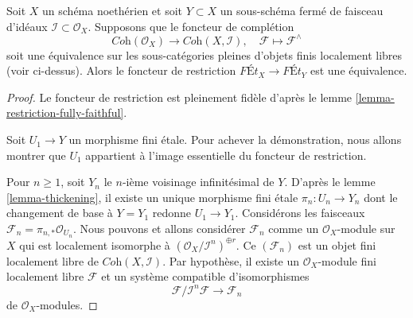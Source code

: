 \begin{lemma}
\label{lemma-restriction-equivalence}
Soit $X$ un schéma noethérien et soit $Y \subset X$ un sous-schéma fermé
de faisceau d'idéaux $\mathcal{I} \subset \mathcal{O}_X$.
Supposons que le foncteur de complétion
$$
\textit{Coh}(\mathcal{O}_X)
\longrightarrow 
\textit{Coh}(X, \mathcal{I}),\quad
\mathcal{F} \longmapsto \mathcal{F}^\wedge
$$
soit une équivalence sur les sous-catégories pleines d'objets finis
localement libres (voir ci-dessus).
Alors le foncteur de restriction $\textit{F\'Et}_X \to \textit{F\'Et}_Y$
est une équivalence.
\end{lemma}

\begin{proof}
Le foncteur de restriction est pleinement fidèle d'après le
lemme \ref{lemma-restriction-fully-faithful}.

\medskip\noindent
Soit $U_1 \to Y$ un morphisme fini étale. Pour achever la démonstration,
nous allons montrer que $U_1$ appartient à l'image essentielle du
foncteur de restriction.

\medskip\noindent
Pour $n \geq 1$, soit $Y_n$ le $n$-ième voisinage infinitésimal de $Y$.
D'après le lemme \ref{lemma-thickening},
il existe un unique morphisme fini étale
$\pi_n : U_n \to Y_n$ dont le changement de base à $Y = Y_1$
redonne $U_1 \to Y_1$.
Considérons les faisceaux $\mathcal{F}_n = \pi_{n, *}\mathcal{O}_{U_n}$.
Nous pouvons et allons considérer $\mathcal{F}_n$ comme un $\mathcal{O}_X$-module sur $X$
qui est localement isomorphe à
$(\mathcal{O}_X/\mathcal{I}^n)^{\oplus r}$.
Ce $(\mathcal{F}_n)$ est un objet fini localement libre de
$\textit{Coh}(X, \mathcal{I})$.
Par hypothèse, il existe un $\mathcal{O}_X$-module fini localement libre
$\mathcal{F}$ et un système compatible d'isomorphismes
$$
\mathcal{F}/\mathcal{I}^n\mathcal{F} \to \mathcal{F}_n
$$
de $\mathcal{O}_X$-modules.


\end{proof}
